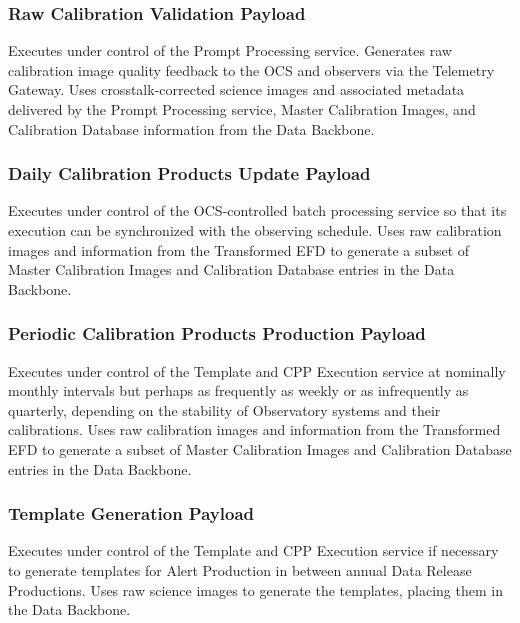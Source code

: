 \documentclass[DM,lsstdraft,toc]{lsstdoc}
\begin{document}
\subsubsection{Raw Calibration Validation
Payload}\label{raw-calibration-validation-payload}

Executes under control of the Prompt Processing service. Generates raw
calibration image quality feedback to the OCS and observers via the
Telemetry Gateway. Uses crosstalk-corrected science images and
associated metadata delivered by the Prompt Processing service, Master
Calibration Images, and Calibration Database information from the Data
Backbone.

\subsubsection{Daily Calibration Products Update
Payload}\label{daily-calibration-products-update-payload}

Executes under control of the OCS-controlled batch processing service so
that its execution can be synchronized with the observing schedule. Uses
raw calibration images and information from the Transformed EFD to
generate a subset of Master Calibration Images and Calibration Database
entries in the Data Backbone.

\subsubsection{Periodic Calibration Products Production
Payload}\label{periodic-calibration-products-production-payload}

Executes under control of the Template and CPP Execution service at
nominally monthly intervals but perhaps as frequently as weekly or as
infrequently as quarterly, depending on the stability of Observatory
systems and their calibrations. Uses raw calibration images and
information from the Transformed EFD to generate a subset of Master
Calibration Images and Calibration Database entries in the Data
Backbone.

\subsubsection{Template Generation
Payload}\label{template-generation-payload}

Executes under control of the Template and CPP Execution service if
necessary to generate templates for Alert Production in between annual
Data Release Productions. Uses raw science images to generate the
templates, placing them in the Data Backbone.
\end{document}
